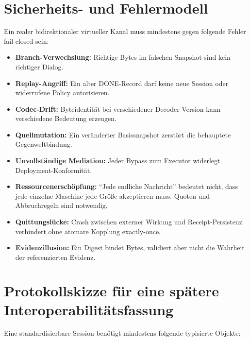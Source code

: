 \documentclass[11pt,a4paper]{article}
\theoremstyle{remark}
\begin{document}
\section{Sicherheits- und Fehlermodell}

Ein realer bidirektionaler virtueller Kanal muss mindestens gegen folgende
Fehler fail-closed sein:

\begin{itemize}
  \item \textbf{Branch-Verwechslung:} Richtige Bytes im falschen Snapshot
        sind kein richtiger Dialog.
  \item \textbf{Replay-Angriff:} Ein alter DONE-Record darf keine neue
        Session oder widerrufene Policy autorisieren.
  \item \textbf{Codec-Drift:} Byteidentität bei verschiedener
        Decoder-Version kann verschiedene Bedeutung erzeugen.
  \item \textbf{Quellmutation:} Ein veränderter Basissnapshot zerstört die
        behauptete Gegenweltbindung.
  \item \textbf{Unvollständige Mediation:} Jeder Bypass zum Executor
        widerlegt Deployment-Konformität.
  \item \textbf{Ressourcenerschöpfung:} ``Jede endliche Nachricht'' bedeutet
        nicht, dass jede einzelne Maschine jede Größe akzeptieren muss.
        Quoten und Abbruchregeln sind notwendig.
  \item \textbf{Quittungslücke:} Crash zwischen externer Wirkung und
        Receipt-Persistenz verhindert ohne atomare Kopplung exactly-once.
  \item \textbf{Evidenzillusion:} Ein Digest bindet Bytes, validiert aber
        nicht die Wahrheit der referenzierten Evidenz.
\end{itemize}

\section{Protokollskizze für eine spätere Interoperabilitätsfassung}

Eine standardisierbare Session benötigt mindestens folgende typisierte
Objekte:
\end{document}
